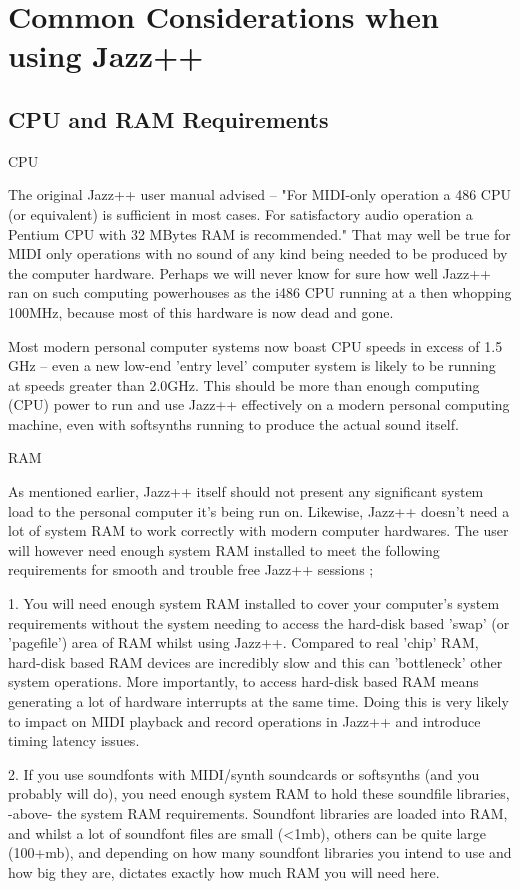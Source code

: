 \documentclass[letterpaper]{report}
\begin{document}
\section{Common Considerations when using Jazz++}

\subsection{CPU and RAM Requirements}

CPU

The original Jazz++ user manual advised -- "For MIDI-only operation
a 486 CPU (or equivalent) is sufficient in most cases.  For satisfactory audio
operation a Pentium CPU with 32 MBytes RAM is recommended." That may well be
true for MIDI only operations with no sound of any kind being needed to be
produced by the computer hardware. Perhaps we will never know for sure how well
Jazz++ ran on such computing powerhouses as the i486 CPU running at a then
whopping 100MHz, because most of this hardware is now dead and gone.

Most modern personal computer systems now boast CPU speeds in excess of 1.5 GHz
-- even a new low-end 'entry level' computer system is likely to be running at
speeds greater than 2.0GHz. This should be more than enough computing (CPU)
power to run and use Jazz++ effectively on a modern personal computing machine,
even with softsynths running to produce the actual sound itself.

RAM

As mentioned earlier, Jazz++ itself should not present any significant system
load to the personal computer it's being run on. Likewise, Jazz++ doesn't need a
lot of system RAM to work correctly with modern computer hardwares. The user
will however need enough system RAM installed to meet the following requirements
for smooth and trouble free Jazz++ sessions ;

1. You will need enough system RAM installed to cover your computer's system
requirements without the system needing to access the hard-disk based 'swap' (or
'pagefile') area of RAM whilst using Jazz++. Compared to real 'chip' RAM,
hard-disk based RAM devices are incredibly slow and this can 'bottleneck'
other system operations. More importantly, to access hard-disk based RAM means
generating a lot of hardware interrupts at the same time. Doing this is very
likely to impact on MIDI playback and record operations in Jazz++ and introduce
timing latency issues.

2. If you use soundfonts with MIDI/synth soundcards or softsynths (and you
probably will do), you need enough system RAM to hold these soundfile libraries,
-above- the system RAM requirements. Soundfont libraries are loaded into RAM,
and whilst a lot of soundfont files are small (<1mb), others can be quite large
(100+mb), and depending on how many soundfont libraries you intend to use and
how big they are, dictates exactly how much RAM you will need here.
\end{document}
